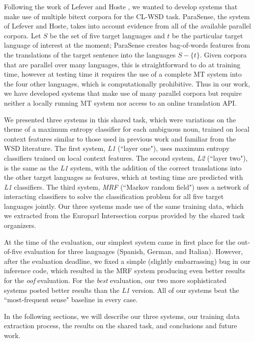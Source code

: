 \documentclass[11pt,letterpaper]{article}
\begin{document}
Following the work of Lefever and Hoste
, we wanted to develop systems
that make use of multiple bitext corpora for the CL-WSD task.  ParaSense, the
system of Lefever and Hoste, takes into account evidence from all of the
available parallel corpora. Let $S$ be the set of five target languages and $t$
be the particular target language of interest at the moment; ParaSense creates
bag-of-words features from the translations of the target sentence into the
languages $S - \lbrace{t \rbrace}$. Given corpora that are parallel over many
languages, this is straightforward to do at training time, however at testing
time it requires the use of a complete MT system into the four other languages,
which is computationally prohibitive. Thus in our work, we have developed
systems that make use of many parallel corpora but require neither a locally
running MT system nor access to an online translation API.

We presented three systems in this shared task, which were variations on the
theme of a maximum entropy classifier for each ambiguous noun, trained on local
context features similar to those used in previous work and familiar from the
WSD literature. The first system, \emph{L1} (``layer one"), uses maximum
entropy classifiers trained on local context features. The second system,
\emph{L2} (``layer two"), is the same as the \emph{L1} system, with the
addition of the correct translations into the other target languages as
features, which at testing time are predicted with \emph{L1} classifiers. The
third system, \emph{MRF} (``Markov random field") uses a network of interacting
classifiers to solve the classification problem for all five target languages
jointly. Our three systems made use of the same training data, which we
extracted from the Europarl Intersection corpus provided by the shared task
organizers.

At the time of the evaluation, our simplest system came in first place for the
out-of-five evaluation for three languages (Spanish, German, and Italian).
However, after the evaluation deadline, we fixed a simple (slightly
embarrassing) bug in our inference code, which resulted in the MRF system
producing even better results for the \emph{oof} evaluation. For the \emph{best}
evaluation, our two more sophisticated systems posted better results than the
\emph{L1} version. All of our systems beat the ``most-frequent sense" baseline
in every case.

In the following sections, we will describe our three systems, our training
data extraction process, the results on the shared task, and conclusions and
future work.
\end{document}
